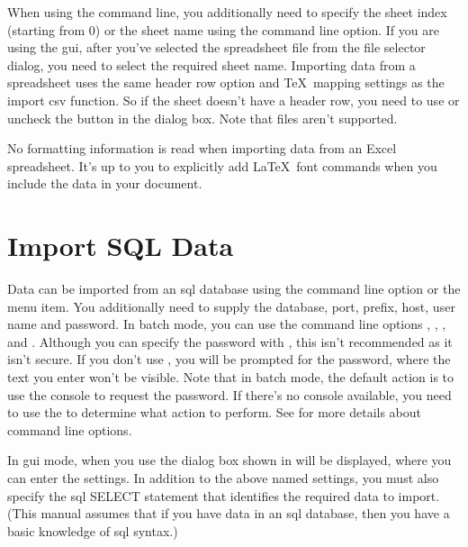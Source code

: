  When using the command line,
   you additionally need to specify the sheet index (starting from 0) or the 
   sheet name using the  command line option. If you are 
   using the \gls{gui}, after you've selected the spreadsheet file 
   from the file selector dialog, you need to select the required sheet 
   name.
Importing data from a spreadsheet uses the same header row option and 
   \TeX\ mapping settings as the import \gls{csv} function. 
   So if the sheet doesn't have a header row, you need to use
    or uncheck the
 button 
   in the  dialog box. Note that 
    files aren't supported.


   \begin{information}
   No formatting information is read when importing
   data from an Excel spreadsheet. It's up to you to explicitly
   add \LaTeX\ font commands when you include the data in your
   document.
   \end{information}


\section{Import SQL Data}\label{sec:importsql}

   Data can be imported from an \gls{sql} database using
   the  command line option or the 
    menu item. You additionally need to
   supply the database, port, prefix, host, user name and password. In batch 
   mode, you can use the command line options ,
   , ,  and
   . Although you can specify the password with 
   , this isn't recommended as it isn't secure. 
   If you don't use , 
   you will be prompted for the password, where the text you enter 
   won't be visible. Note that in batch mode, the default action
   is to use the console to request the password. If there's no
console available, you need to use the 
   to determine what action to perform. See  for more details
   about command line options.


   In \gls{gui} mode, when you use 
   the dialog box shown in  will be displayed,
   where you can enter the settings. In addition to the above named settings,
   you must also specify the \gls{sql} SELECT statement that identifies 
   the required data to import. (This manual assumes that if you have
   data in an \gls{sql} database, then you have a basic
   knowledge of \gls{sql} syntax.)

